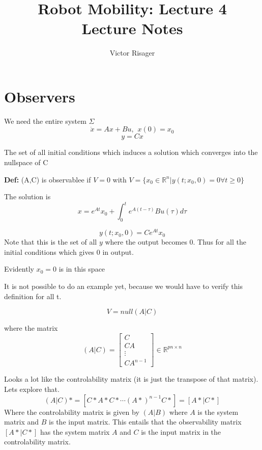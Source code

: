 \documentclass[a4paper]{article}
\title{Robot Mobility: Lecture 4 \\
	\large Lecture Notes}
\author{Victor Risager}
\begin{document}
\maketitle
\section{Observers}
We need the entire system $ \Sigma $
 \begin{equation}
	 \dot{x} = Ax + Bu, \hspace{5pt} x(0) = x_0
\end{equation}
\begin{equation}
y = Cx
\end{equation}

The set of all initial conditions which induces a solution which converges into the nullspace of C
\begin{framed}
	\textbf{Def:} (A,C) is observablee if $ V = {0}$ with  $ V = \{x_0 \in \mathbb{R}^{n} | y(t; x_0, 0) = 0 \forall t \geq 0\} $ 
\end{framed}

The solution is 
\begin{equation}
 x = e^{At} x_0 + \int_{0}^{t}{e^{A(t-\tau)} Bu(\tau) d \tau}   
\end{equation}

\begin{equation}
y(t;x_0,0) = C e^{At}x_0 
\end{equation}
Note that this is the set of all $ y $ where the output becomes 0. Thus for all the initial conditions which gives 0 in output.

Evidently $ x_0 = 0 $ is in this space

It is not possible to do an example yet, because we would have to verify this definition for all t.

\begin{equation}
V = null(A|C)
\end{equation}

where the matrix
\begin{equation}
	(A|C) = \begin{bmatrix}
	C \\
	C A\\
	\vdots \\
	C A^{n-1}  
	\end{bmatrix} \in \mathbb{R}^{pn \times n} 
\end{equation}

Looks a lot like the controlability matrix (it is just the transpose of that matrix). Lets explore that.
\begin{equation}
	(A|C)* = \left[C* A*C* \cdots (A*)^{n-1}C* \right] = [A*|C*] 
\end{equation}
Where the controlability matrix is given by $ (A|B) $ where  $ A $ is the system matrix and  $ B $ is the input matrix. This entails that the observability matrix $ [A*|C*] $ has the system matrix  $ A $ and  $ C $ is the input matrix in the controlability matrix.
\end{document}
